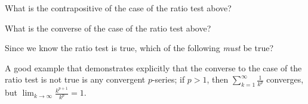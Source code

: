 \documentclass{ximera}
\begin{document}
\begin{exercise}
\begin{exercise}
What is the contrapositive of the case of the ratio test above?
\begin{multipleChoice}
\end{multipleChoice}

What is the converse of the case of the ratio test above?
\begin{multipleChoice}
\end{multipleChoice}

Since we know the ratio test is true, which of the following \emph{must} be true?
\begin{multipleChoice}
\end{multipleChoice}

\begin{feedback}
A good example that demonstrates explicitly that the converse to the case of the ratio test is not true is any convergent $p$-series; if $p>1$, then $\sum_{k=1}^{\infty} \frac{1}{k^p}$ converges, but $\lim_{k \to \infty} \frac{k^{p+1}}{k^p} =1$.
\end{feedback}

\end{exercise}
\end{exercise}
\end{document}

